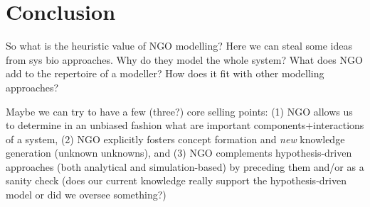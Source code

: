 \section{Conclusion}

So what is the heuristic value of NGO modelling? Here we can steal some ideas from sys bio approaches. Why do they model the whole system? What does NGO add to the repertoire of a modeller? How does it fit with other modelling approaches? 

Maybe we can try to have a few (three?) core selling points: (1) NGO allows us to determine in an unbiased fashion what are important components+interactions of a system, (2) NGO explicitly fosters concept formation and \emph{new} knowledge generation (unknown unknowns), and (3) NGO complements hypothesis-driven approaches (both analytical and simulation-based) by preceding them and/or as a sanity check (does our current knowledge really support the hypothesis-driven model or did we oversee something?)